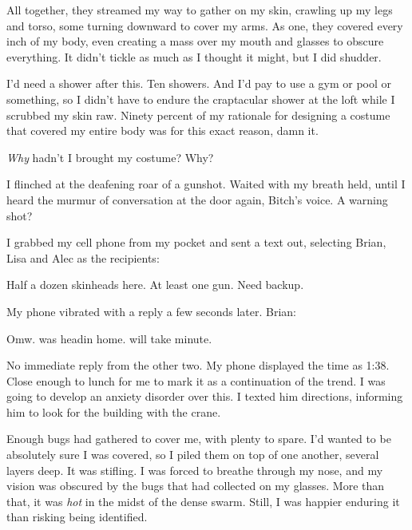 All together, they streamed my way to gather on my skin, crawling up my legs and torso, some turning downward to cover my arms.  As one, they covered every inch of my body, even creating a mass over my mouth and glasses to obscure everything.  It didn't tickle as much as I thought it might, but I did shudder.



I'd need a shower after this.  Ten showers.  And I'd pay to use a gym or pool or something, so I didn't have to endure the craptacular shower at the loft while I scrubbed my skin raw.  Ninety percent of my rationale for designing a costume that covered my entire body was for this exact reason, damn it.



\emph{Why} hadn't I brought my costume?  Why?



I flinched at the deafening roar of a gunshot.  Waited with my breath held, until I heard the murmur of conversation at the door again, Bitch's voice.  A warning shot?



I grabbed my cell phone from my pocket and sent a text out, selecting Brian, Lisa and Alec as the recipients:



Half a dozen skinheads here.  At least one gun.  Need backup.



My phone vibrated with a reply a few seconds later. Brian:



Omw.  was headin home.  will take minute.



No immediate reply from the other two.  My phone displayed the time as 1:38.  Close enough to lunch for me to mark it as a continuation of the trend.  I was going to develop an anxiety disorder over this.  I texted him directions, informing him to look for the building with the crane.



Enough bugs had gathered to cover me, with plenty to spare.  I'd wanted to be absolutely sure I was covered, so I piled them on top of one another, several layers deep.  It was stifling.  I was forced to breathe through my nose, and my vision was obscured by the bugs that had collected on my glasses.   More than that, it was \emph{hot} in the midst of the dense swarm.  Still, I was happier enduring it than risking being identified.



